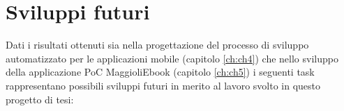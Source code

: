 

\section{Sviluppi futuri}
Dati i risultati ottenuti sia nella progettazione del processo di sviluppo automatizzato per le applicazioni mobile (capitolo \ref{ch:ch4}) che nello sviluppo della applicazione PoC MaggioliEbook (capitolo \ref{ch:ch5}) i seguenti task rappresentano possibili sviluppi futuri in merito al lavoro svolto in questo progetto di tesi:

